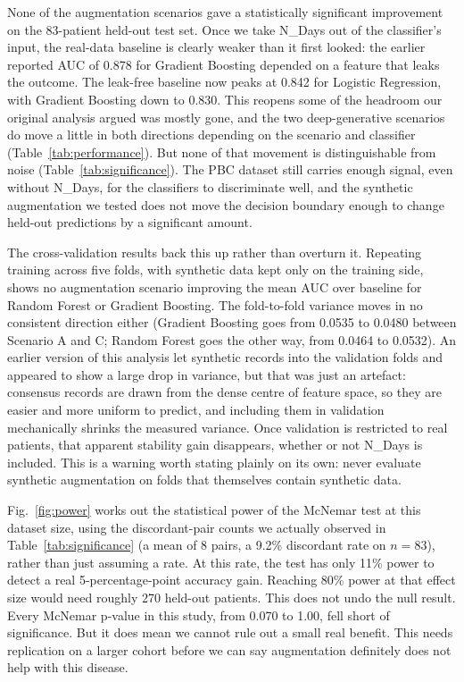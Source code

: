 \documentclass[journal]{IEEEtran}
\begin{document}
None of the augmentation scenarios gave a statistically significant improvement on the 83-patient held-out test set. Once we take N\_Days out of the classifier's input, the real-data baseline is clearly weaker than it first looked: the earlier reported AUC of 0.878 for Gradient Boosting depended on a feature that leaks the outcome. The leak-free baseline now peaks at 0.842 for Logistic Regression, with Gradient Boosting down to 0.830. This reopens some of the headroom our original analysis argued was mostly gone, and the two deep-generative scenarios do move a little in both directions depending on the scenario and classifier (Table~\ref{tab:performance}). But none of that movement is distinguishable from noise (Table~\ref{tab:significance}). The PBC dataset still carries enough signal, even without N\_Days, for the classifiers to discriminate well, and the synthetic augmentation we tested does not move the decision boundary enough to change held-out predictions by a significant amount.

The cross-validation results back this up rather than overturn it. Repeating training across five folds, with synthetic data kept only on the training side, shows no augmentation scenario improving the mean AUC over baseline for Random Forest or Gradient Boosting. The fold-to-fold variance moves in no consistent direction either (Gradient Boosting goes from 0.0535 to 0.0480 between Scenario A and C; Random Forest goes the other way, from 0.0464 to 0.0532). An earlier version of this analysis let synthetic records into the validation folds and appeared to show a large drop in variance, but that was just an artefact: consensus records are drawn from the dense centre of feature space, so they are easier and more uniform to predict, and including them in validation mechanically shrinks the measured variance. Once validation is restricted to real patients, that apparent stability gain disappears, whether or not N\_Days is included. This is a warning worth stating plainly on its own: never evaluate synthetic augmentation on folds that themselves contain synthetic data.

\label{sec:power}
Fig.~\ref{fig:power} works out the statistical power of the McNemar test at this dataset size, using the discordant-pair counts we actually observed in Table~\ref{tab:significance} (a mean of 8 pairs, a 9.2\% discordant rate on $n=83$), rather than just assuming a rate. At this rate, the test has only 11\% power to detect a real 5-percentage-point accuracy gain. Reaching 80\% power at that effect size would need roughly 270 held-out patients. This does not undo the null result. Every McNemar p-value in this study, from 0.070 to 1.00, fell short of significance. But it does mean we cannot rule out a small real benefit. This needs replication on a larger cohort before we can say augmentation definitely does not help with this disease.
\end{document}
